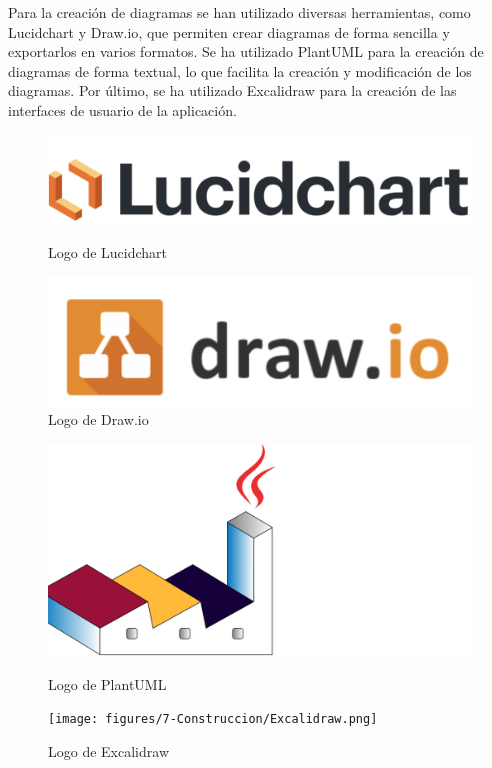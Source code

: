 Para la creación de diagramas se han utilizado diversas herramientas, como Lucidchart\cite{lucidchart} y Draw.io\cite{drawio}, que permiten crear diagramas de forma sencilla y exportarlos en varios formatos.
Se ha utilizado PlantUML\cite{plantuml} para la creación de diagramas de forma textual, lo que facilita la creación y modificación de los diagramas. 
Por último, se ha utilizado Excalidraw\cite{excalidraw} para la creación de las interfaces de usuario de la aplicación.

\begin{figure}[H]
    \centering
    \begin{minipage}{0.2\textwidth}
        \centering
        \includegraphics[width=\textwidth]{figures/7-Construccion/Lucidchart.png}
        \caption{Logo de Lucidchart}
    \end{minipage}
    \hfill
    \begin{minipage}{0.2\textwidth}
        \centering
        \includegraphics[width=\textwidth]{figures/7-Construccion/Drawio.png}
        \caption{Logo de Draw.io}
    \end{minipage}
\end{figure}

\begin{figure}[H]
    \centering
    \begin{minipage}{0.2\textwidth}
        \centering
        \includegraphics[width=\textwidth]{figures/7-Construccion/PlantUML.png}
        \caption{Logo de PlantUML}
    \end{minipage}
    \hfill
    \begin{minipage}{0.2\textwidth}
        \centering
        \texttt{[image: figures/7-Construccion/Excalidraw.png]}
        \caption{Logo de Excalidraw}
    \end{minipage}
\end{figure}


